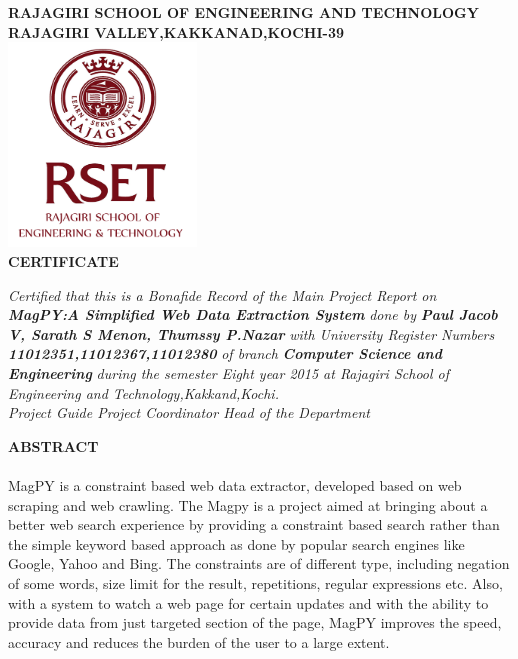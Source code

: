 \documentclass[a4paper]{report}
\begin{document}
\newpage
\begin{center}
\thispagestyle{empty}
\pagestyle{empty}
\large\textbf{RAJAGIRI SCHOOL OF ENGINEERING AND TECHNOLOGY}\\[.3cm]
\normalsize\textbf{RAJAGIRI VALLEY,KAKKANAD,KOCHI-39}\\[.6cm]
\vspace{.5cm}
\includegraphics[width=5.0cm]{Logo.png} \\[.7cm]
\vspace{.5cm}
\large\textbf{CERTIFICATE}\\[.5cm]
\end{center}
\large\textit{Certified that this is a Bonafide Record of the Main Project Report on }
\large\textit{\textbf{MagPY:A Simplified Web Data Extraction System }}
\large\textit{done by }
\large\textit{\textbf{Paul Jacob V, Sarath S Menon, Thumssy P.Nazar }}
\large\textit{with University Register Numbers }
\large\textit{\textbf{11012351,11012367,11012380 }}
\large\textit{of branch }
\large\textit{\textbf{Computer Science and Engineering }}
\large\textit{during the semester Eight year 2015 at Rajagiri School of Engineering and Technology,Kakkand,Kochi.}\\[2.0cm]

\large\textit{\noindent Project Guide \hfill Project Coordinator \hfill Head of the Department}


\newpage
\begin{center}
\fontsize{16.28pt}{19.2pt}
\textbf{ABSTRACT}\\[0.1cm]
\end{center}
\setcounter{page}{2}

\paragraph{}
\large\textnormal{MagPY is a constraint based web data extractor, developed based on web scraping and web crawling. The Magpy is a project aimed at bringing about a better web search experience by providing a constraint based search rather than the simple keyword based approach as done by popular search engines like Google, Yahoo and Bing. The constraints are of different type, including negation of some words, size limit for the result, repetitions, regular expressions etc. Also, with a system to watch a web page for certain updates and with the ability to provide data from just targeted section of the page, MagPY improves the speed, accuracy and reduces the burden of the user to a large extent. }
\end{document}
